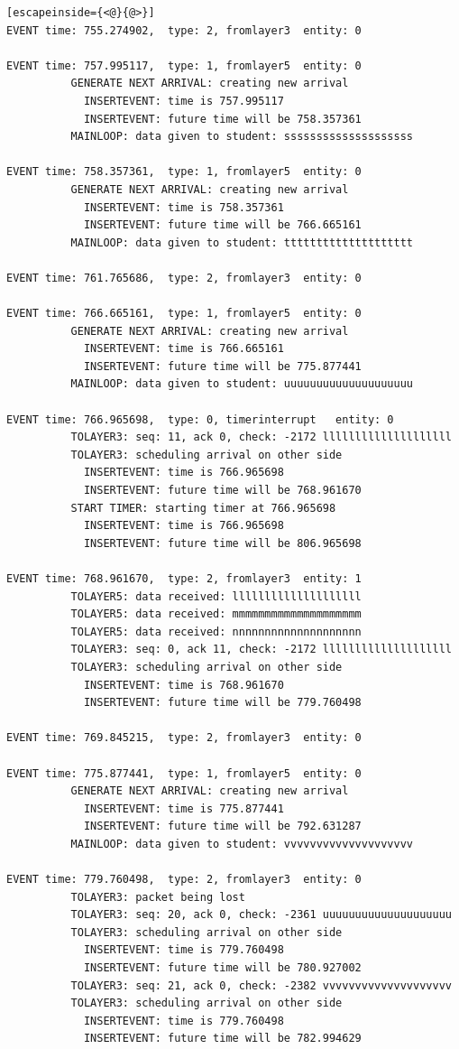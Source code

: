 \documentclass[paper=a4, fontsize=11pt]{scrartcl}
\numberwithin{equation}{section}		%
\numberwithin{figure}{section}			%
\numberwithin{table}{section}				%
\begin{document}
\begin{lstlisting}[escapeinside={<@}{@>}]
EVENT time: 755.274902,  type: 2, fromlayer3  entity: 0

EVENT time: 757.995117,  type: 1, fromlayer5  entity: 0
          GENERATE NEXT ARRIVAL: creating new arrival
            INSERTEVENT: time is 757.995117
            INSERTEVENT: future time will be 758.357361
          MAINLOOP: data given to student: ssssssssssssssssssss

EVENT time: 758.357361,  type: 1, fromlayer5  entity: 0
          GENERATE NEXT ARRIVAL: creating new arrival
            INSERTEVENT: time is 758.357361
            INSERTEVENT: future time will be 766.665161
          MAINLOOP: data given to student: tttttttttttttttttttt

EVENT time: 761.765686,  type: 2, fromlayer3  entity: 0

EVENT time: 766.665161,  type: 1, fromlayer5  entity: 0
          GENERATE NEXT ARRIVAL: creating new arrival
            INSERTEVENT: time is 766.665161
            INSERTEVENT: future time will be 775.877441
          MAINLOOP: data given to student: uuuuuuuuuuuuuuuuuuuu

EVENT time: 766.965698,  type: 0, timerinterrupt   entity: 0
          TOLAYER3: seq: 11, ack 0, check: -2172 llllllllllllllllllll
          TOLAYER3: scheduling arrival on other side
            INSERTEVENT: time is 766.965698
            INSERTEVENT: future time will be 768.961670
          START TIMER: starting timer at 766.965698
            INSERTEVENT: time is 766.965698
            INSERTEVENT: future time will be 806.965698

EVENT time: 768.961670,  type: 2, fromlayer3  entity: 1
          TOLAYER5: data received: llllllllllllllllllll
          TOLAYER5: data received: mmmmmmmmmmmmmmmmmmmm
          TOLAYER5: data received: nnnnnnnnnnnnnnnnnnnn
          TOLAYER3: seq: 0, ack 11, check: -2172 llllllllllllllllllll
          TOLAYER3: scheduling arrival on other side
            INSERTEVENT: time is 768.961670
            INSERTEVENT: future time will be 779.760498

EVENT time: 769.845215,  type: 2, fromlayer3  entity: 0

EVENT time: 775.877441,  type: 1, fromlayer5  entity: 0
          GENERATE NEXT ARRIVAL: creating new arrival
            INSERTEVENT: time is 775.877441
            INSERTEVENT: future time will be 792.631287
          MAINLOOP: data given to student: vvvvvvvvvvvvvvvvvvvv

EVENT time: 779.760498,  type: 2, fromlayer3  entity: 0
          TOLAYER3: packet being lost
          TOLAYER3: seq: 20, ack 0, check: -2361 uuuuuuuuuuuuuuuuuuuu
          TOLAYER3: scheduling arrival on other side
            INSERTEVENT: time is 779.760498
            INSERTEVENT: future time will be 780.927002
          TOLAYER3: seq: 21, ack 0, check: -2382 vvvvvvvvvvvvvvvvvvvv
          TOLAYER3: scheduling arrival on other side
            INSERTEVENT: time is 779.760498
            INSERTEVENT: future time will be 782.994629


\end{lstlisting}
\end{document}
